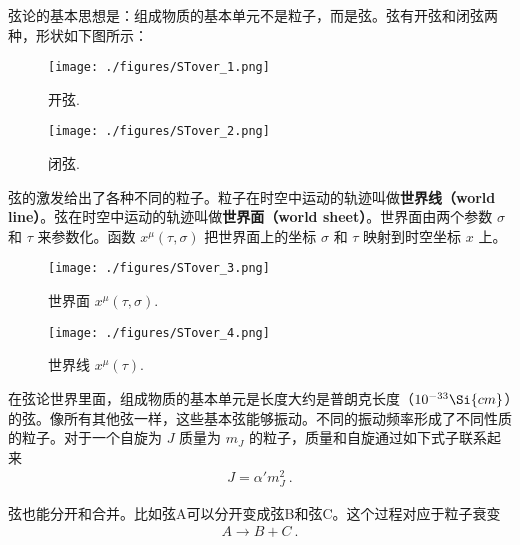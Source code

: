 
\begin{issues}
\issueNeedCite
\issueMissDepend
\end{issues}

弦论的基本思想是：组成物质的基本单元不是粒子，而是弦。弦有开弦和闭弦两种，形状如下图所示：
\begin{figure}[ht]
\centering
\texttt{[image: ./figures/STover\_1.png]}
\caption{开弦.} \label{STover_fig1}
\end{figure}
\begin{figure}[ht]
\centering
\texttt{[image: ./figures/STover\_2.png]}
\caption{闭弦.} \label{STover_fig2}
\end{figure}
弦的激发给出了各种不同的粒子。粒子在时空中运动的轨迹叫做\textbf{世界线（world line）}。弦在时空中运动的轨迹叫做\textbf{世界面（world sheet）}。世界面由两个参数 $\sigma$ 和 $\tau$ 来参数化。函数 $x^\mu(\tau,\sigma)$ 把世界面上的坐标 $\sigma$ 和 $\tau$ 映射到时空坐标 $x$ 上。

\begin{figure}[ht]
\centering
\texttt{[image: ./figures/STover\_3.png]}
\caption{世界面 $x^\mu (\tau,\sigma)$.} \label{STover_fig3}
\end{figure}

\begin{figure}[ht]
\centering
\texttt{[image: ./figures/STover\_4.png]}
\caption{世界线 $x^\mu(\tau)$.} \label{STover_fig4}
\end{figure}

在弦论世界里面，组成物质的基本单元是长度大约是普朗克长度（$10^{-33}\Si{cm}$）的弦。像所有其他弦一样，这些基本弦能够振动。不同的振动频率形成了不同性质的粒子。对于一个自旋为 $J$ 质量为 $m_J$ 的粒子，质量和自旋通过如下式子联系起来
\begin{align}
J = \alpha' m_J^2~.
\end{align}

弦也能分开和合并。比如弦A可以分开变成弦B和弦C。这个过程对应于粒子衰变
\begin{align}
A \rightarrow B + C~.
\end{align}


